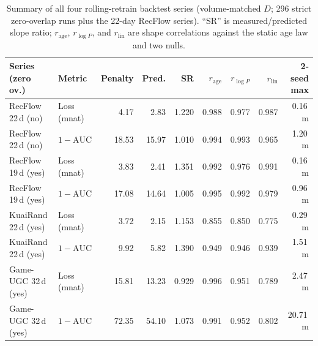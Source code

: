 \documentclass[10pt,letterpaper]{article}
\begin{document}
\begin{table}[t]
\centering
\caption{Summary of all four rolling-retrain backtest series (volume-matched
$D$; 296 strict zero-overlap runs plus the 22-day RecFlow series). ``SR'' is
measured/predicted slope ratio; $r_{\mathrm{age}}$, $r_{\log P}$, and
$r_{\mathrm{lin}}$ are shape correlations against the static age law and two nulls.}
\label{tab:backtest_summary_s9}
\scriptsize
\setlength{\tabcolsep}{3.5pt}
\begin{tabular}{llrrrrrrr}
\toprule
Series (zero ov.) & Metric & Penalty & Pred. & SR & $r_{\mathrm{age}}$ & $r_{\log P}$ & $r_{\mathrm{lin}}$ & 2-seed max \\
\midrule
RecFlow 22\,d (no)   & Loss (mnat)     &  4.17 &  2.83 & 1.220 & 0.988 & 0.977 & 0.987 & 0.16\,m \\
RecFlow 22\,d (no)   & $1{-}\mathrm{AUC}$ & 18.53 & 15.97 & 1.010 & 0.994 & 0.993 & 0.965 & 1.20\,m \\
RecFlow 19\,d (yes)  & Loss (mnat)     &  3.83 &  2.41 & 1.351 & 0.992 & 0.976 & 0.991 & 0.16\,m \\
RecFlow 19\,d (yes)  & $1{-}\mathrm{AUC}$ & 17.08 & 14.64 & 1.005 & 0.995 & 0.992 & 0.979 & 0.96\,m \\
KuaiRand 22\,d (yes) & Loss (mnat)     &  3.72 &  2.15 & 1.153 & 0.855 & 0.850 & 0.775 & 0.29\,m \\
KuaiRand 22\,d (yes) & $1{-}\mathrm{AUC}$ &  9.92 &  5.82 & 1.390 & 0.949 & 0.946 & 0.939 & 1.51\,m \\
Game-UGC 32\,d (yes) & Loss (mnat)     & 15.81 & 13.23 & 0.929 & 0.996 & 0.951 & 0.789 & 2.47\,m \\
Game-UGC 32\,d (yes) & $1{-}\mathrm{AUC}$ & 72.35 & 54.10 & 1.073 & 0.991 & 0.952 & 0.802 & 20.71\,m \\
\bottomrule
\end{tabular}
\end{table}
\end{document}
